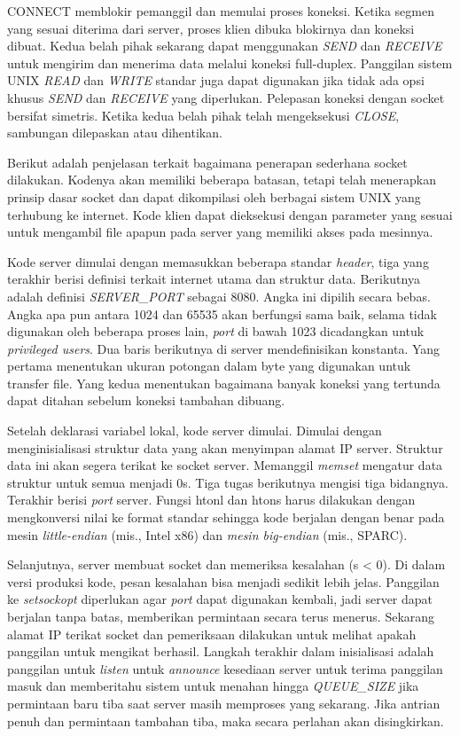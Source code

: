 CONNECT memblokir pemanggil dan memulai proses koneksi. Ketika segmen yang sesuai diterima dari server, proses klien dibuka blokirnya dan koneksi dibuat. Kedua belah pihak sekarang dapat menggunakan \emph{SEND} dan \emph{RECEIVE} untuk mengirim dan menerima data melalui koneksi full-duplex. Panggilan sistem UNIX \emph{READ} dan \emph{WRITE} standar juga dapat digunakan jika tidak ada opsi khusus \emph{SEND} dan \emph{RECEIVE} yang diperlukan. Pelepasan koneksi dengan socket bersifat simetris. Ketika kedua belah pihak telah mengeksekusi \emph{CLOSE}, sambungan dilepaskan atau dihentikan.

Berikut adalah penjelasan terkait bagaimana penerapan sederhana socket dilakukan. Kodenya akan memiliki beberapa batasan, tetapi telah menerapkan prinsip dasar socket dan dapat dikompilasi oleh berbagai sistem UNIX yang terhubung ke internet. Kode klien dapat dieksekusi dengan parameter yang sesuai untuk mengambil file apapun pada server yang memiliki akses pada mesinnya. 

Kode server dimulai dengan memasukkan beberapa standar \emph{header}, tiga yang terakhir berisi definisi terkait internet utama dan struktur data. Berikutnya adalah definisi \emph{SERVER\_PORT} sebagai 8080. Angka ini dipilih secara bebas. Angka apa pun antara 1024 dan 65535 akan berfungsi sama baik, selama tidak digunakan oleh beberapa proses lain, \emph{port} di bawah 1023 dicadangkan untuk \emph{privileged users}. Dua baris berikutnya di server mendefinisikan konstanta. Yang pertama menentukan ukuran potongan dalam byte yang digunakan untuk transfer file. Yang kedua menentukan bagaimana banyak koneksi yang tertunda dapat ditahan sebelum koneksi tambahan dibuang.

Setelah deklarasi variabel lokal, kode server dimulai. Dimulai dengan menginisialisasi struktur data yang akan menyimpan alamat IP server. Struktur data ini akan segera terikat ke socket server. Memanggil \emph{memset} mengatur data struktur untuk semua menjadi 0s. Tiga tugas berikutnya mengisi tiga bidangnya. Terakhir berisi \emph{port} server. Fungsi htonl dan htons harus dilakukan dengan mengkonversi nilai ke format standar sehingga kode berjalan dengan benar pada mesin \emph{little-endian} (mis., Intel x86) dan \emph{mesin big-endian} (mis., SPARC).

Selanjutnya, server membuat socket dan memeriksa kesalahan (s < 0). Di dalam versi produksi kode, pesan kesalahan bisa menjadi sedikit lebih jelas. Panggilan ke \emph{setsockopt} diperlukan agar \emph{port} dapat digunakan kembali, jadi server dapat berjalan tanpa batas, memberikan permintaan secara terus menerus. Sekarang alamat IP terikat socket dan pemeriksaan dilakukan untuk melihat apakah panggilan untuk mengikat berhasil. Langkah terakhir dalam inisialisasi adalah panggilan untuk \emph{listen} untuk \emph{announce} kesediaan server untuk terima panggilan masuk dan memberitahu sistem untuk menahan hingga \emph{QUEUE\_SIZE} jika permintaan baru tiba saat server masih memproses yang sekarang. Jika antrian penuh dan permintaan tambahan tiba, maka secara perlahan akan disingkirkan.

